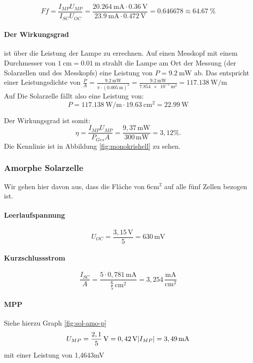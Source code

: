 \documentclass[12pt,a4paper,ngerman]{report}
\begin{document}
		$$    Ff=\frac{I_{MP}U_{MP}}{I_{SC}U_{OC}}= \frac{\qty{20,264}{\milli\ampere}\cdot \qty{0,36}{\volt}}{\qty{23,9}{\milli\ampere} \cdot \qty{0,472}{\volt}} = \num{0,646678} \approx \qty{64,67}{\percent}  $$
		
		\paragraph{Der Wirkungsgrad} ist über die Leistung der Lampe zu errechnen. Auf einen Messkopf mit einem Durchmesser von $\SI{1}{\centi\m} = \qty{0,01}{\m}$ strahlt die Lampe am Ort der Messung (der Solarzellen und des Messkopfs) eine Leistung von $P = \SI{9,2}{\milli\watt} $ ab. Das entspricht einer Leistungsdichte von $\frac{P}{A} = \frac{\qty{9,2}{\milli\watt}}{\pi\cdot(\qty{0,005}{\m})^2} = \frac{\qty{9,2}{\milli\watt}}{\qty{7,854e-5}{\square\metre}} = \qty{117,138}{\watt\per\m} $\\
		Auf Die Solarzelle fällt also eine Leistung von:
		\[P = \qty{117,138}{\watt\per\m} \cdot \qty{19,63}{\centi\m^2} = \qty{22,99}{\watt}\]
		
		Der Wirkungsgrad ist somit:
		$$
		\eta=\frac{I_{MP}U_{MP}}{P_{Ges}A}=\frac{9,37\,\text{mW}}{300\,\text{mW}}=3,12\%.
		$$
		Die Kennlinie ist in Abbildung \ref{fig:monokrishell} zu sehen.\\
		
		
		
		
		\subsubsection{Amorphe Solarzelle}
		Wir gehen hier davon aus, dass die Fläche von 6cm$^2$ auf alle fünf Zellen bezogen ist.
		\paragraph{Leerlaufspannung}
		$$
			U_{OC} =\frac{3,15\,\text{V}}{5}=630\,\text{mV}
		$$
		
		\paragraph{Kurzschlussstrom}
		$$ \frac{I_{SC}}{A}=\frac{5\cdot0,781\,\text{mA}}{\frac{6}{5}\,\text{cm}^2} =3,254\,\frac{\text{mA}}{\text{cm}^2 }$$
		
		\paragraph{MPP} Siehe hierzu Graph \ref{fig:sol-amo-p}
		$$
			U_{MP}=\frac{2,1}{5}\,\text{V}=0,42\,\text{V}\\
			\vert I_{MP}\vert=3,49\,\text{mA}
		$$
		mit einer Leistung von 1,4643mV
		
\end{document}
